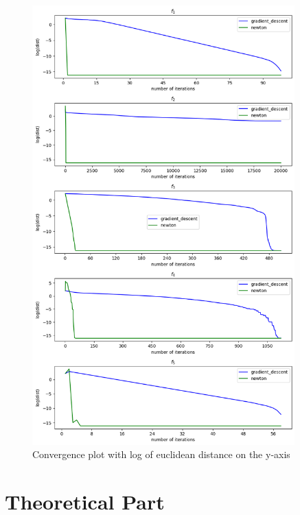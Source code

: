 \documentclass[a4paper]{article}
\begin{document}
\begin{figure}[]
    \centering
    \includegraphics[width=0.9\textwidth]{plt_dist100.png}
    \caption{Convergence plot with log of euclidean distance on the y-axis}
  \label{plt2}
\end{figure}



\section{Theoretical Part}
\end{document}

